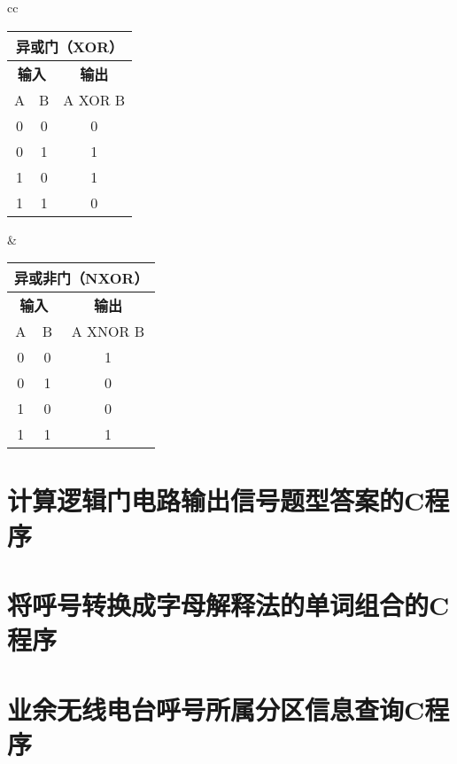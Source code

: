 \bigskip

\begin{tabular}{cc}%
	\begin{tabular}{|c|c|c|}
		\multicolumn{3}{c}{\textbf{异或门（XOR）}} \\
		\hline
		\multicolumn{2}{|c|}{\textbf{输入}} & \textbf{输出} \\
		\hline
		A & B & A XOR B \\
		\hline
		0 & 0 & 0 \\
		\hline
		0 & 1 & 1 \\
		\hline
		1 & 0 & 1 \\
		\hline
		1 & 1 & 0 \\
		\hline
	\end{tabular} &
	\begin{tabular}{|c|c|c|}
		\multicolumn{3}{c}{\textbf{异或非门（NXOR）}} \\
		\hline
		\multicolumn{2}{|c|}{\textbf{输入}} & \textbf{输出} \\
		\hline
		A & B & A XNOR B \\
		\hline
		0 & 0 & 1 \\
		\hline
		0 & 1 & 0 \\
		\hline
		1 & 0 & 0 \\
		\hline
		1 & 1 & 1 \\
		\hline
	\end{tabular} \tabularnewline
\end{tabular}

\newpage

\section{计算逻辑门电路输出信号题型答案的C程序}



\newpage



\section{将呼号转换成字母解释法的单词组合的C程序}



\newpage



\section{业余无线电台呼号所属分区信息查询C程序}

